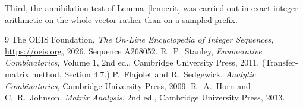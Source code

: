 \documentclass[11pt,a4paper]{article}
\theoremstyle{plain}
\theoremstyle{definition}
\begin{document}
Third, the annihilation test of Lemma~\ref{lem:crit} was carried out in exact integer
arithmetic on the whole vector rather than on a sampled prefix.

\begin{thebibliography}{9}
 The OEIS Foundation, \emph{The On-Line Encyclopedia of Integer
Sequences}, \url{https://oeis.org}, 2026. Sequence A268052.
 R.~P.~Stanley, \emph{Enumerative Combinatorics}, Volume 1, 2nd ed.,
Cambridge University Press, 2011. (Transfer-matrix method, Section 4.7.)
 P.~Flajolet and R.~Sedgewick, \emph{Analytic Combinatorics}, Cambridge
University Press, 2009.
 R.~A.~Horn and C.~R.~Johnson, \emph{Matrix Analysis}, 2nd ed., Cambridge
University Press, 2013.
\end{thebibliography}
\end{document}
